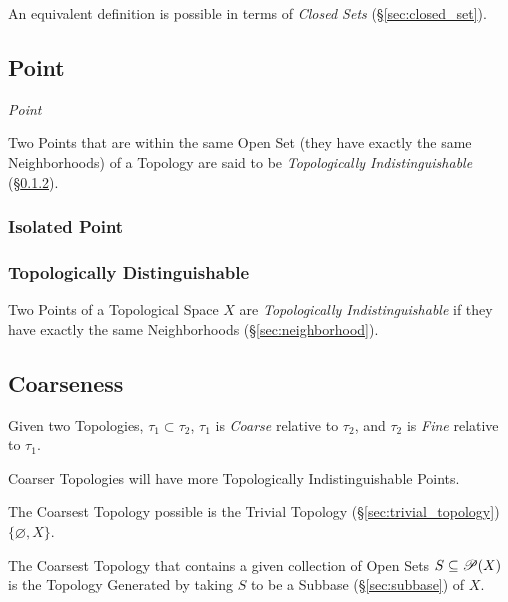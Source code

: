 An equivalent definition is possible in terms of \emph{Closed Sets}
(\S\ref{sec:closed_set}).



\subsection{Point}\label{sec:topological_point}

\emph{Point}

Two Points that are within the same Open Set (they have exactly the
same Neighborhoods) of a Topology are said to be \emph{Topologically
  Indistinguishable} (\S\ref{sec:topologically_distinguishable}).



\subsubsection{Isolated Point}\label{sec:isolated_point}

\subsubsection{Topologically Distinguishable}
\label{sec:topologically_distinguishable}

Two Points of a Topological Space $X$ are \emph{Topologically
  Indistinguishable} if they have exactly the same Neighborhoods
(\S\ref{sec:neighborhood}).



\subsection{Coarseness}\label{sec:coarseness}

Given two Topologies, $\tau_1 \subset \tau_2$, $\tau_1$ is
\emph{Coarse} relative to $\tau_2$, and $\tau_2$ is \emph{Fine}
relative to $\tau_1$.

Coarser Topologies will have more Topologically Indistinguishable
Points.

The Coarsest Topology possible is the Trivial Topology
(\S\ref{sec:trivial_topology}) $\{ \varnothing, X \}$.

The Coarsest Topology that contains a given collection of Open Sets $S
\subseteq \mathscr{P}(X)$ is the Topology Generated by taking $S$ to
be a Subbase (\S\ref{sec:subbase}) of $X$.

